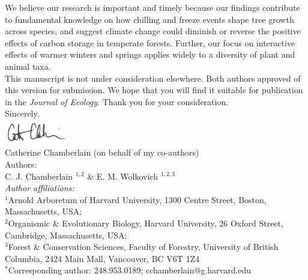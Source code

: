\documentclass[11pt,a4paper]{article}\usepackage[]{graphicx}\usepackage[]{color}
\begin{document}
\noindent We believe our research is important and timely because our findings contribute to fundamental knowledge on how chilling and freeze events shape tree growth across species, and suggest climate change could diminish or reverse the positive effects of carbon storage in temperate forests. Further, our focus on interactive effects of warmer winters and springs applies widely to a diversity of plant and animal taxa. \\ %

\noindent This manuscript is not under consideration elsewhere. Both authors approved of this version for submission. We hope that you will find it suitable for publication in the \textit{Journal of Ecology}. Thank you for your consideration. \\

\vspace{1.5ex}
\noindent Sincerely, \\
\includegraphics[width=0.2\textwidth]{full_signature.jpg} \\
\noindent Catherine Chamberlain (on behalf of my co-authors)
\vspace{2ex}\\
\noindent Authors:\\
C. J. Chamberlain $^{1,2}$ \& E. M. Wolkovich $^{1,2,3}$
\vspace{2ex}\\
\emph{Author affiliations:}\\
$^{1}$Arnold Arboretum of Harvard University, 1300 Centre Street, Boston, Massachusetts, USA; \\
$^{2}$Organismic \& Evolutionary Biology, Harvard University, 26 Oxford Street, Cambridge, Massachusetts, USA; \\
$^{3}$Forest \& Conservation Sciences, Faculty of Forestry, University of British Columbia, 2424 Main Mall, Vancouver, BC V6T 1Z4\\
\vspace{2ex}
$^*$Corresponding author: 248.953.0189; cchamberlain@g.harvard.edu\\

%
\end{document}
